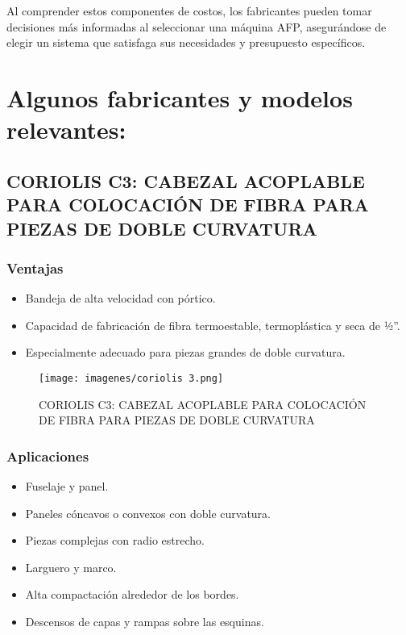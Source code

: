 \begin{enumerate}[label=\arabic*.]
Al comprender estos componentes de costos, los fabricantes pueden tomar decisiones más informadas al seleccionar una máquina AFP, asegurándose de elegir un sistema que satisfaga sus necesidades y presupuesto específicos.

\section{Algunos fabricantes y modelos relevantes:}

\subsection{CORIOLIS C3: CABEZAL ACOPLABLE PARA
COLOCACIÓN DE FIBRA PARA PIEZAS DE DOBLE CURVATURA}

\subsubsection{Ventajas}

\begin{itemize}
    \item Bandeja de alta velocidad con pórtico.
    \item Capacidad de fabricación de fibra termoestable, termoplástica y seca de 1⁄2”.
    \item Especialmente adecuado para piezas grandes de doble curvatura.
\end{itemize}

\begin{figure}[h]
    \centering
    \texttt{[image: imagenes/coriolis 3.png]}
    \caption{CORIOLIS C3: CABEZAL ACOPLABLE PARA
COLOCACIÓN DE FIBRA PARA PIEZAS DE DOBLE CURVATURA}
    \label{fig:enter-label}
\end{figure}


\subsubsection{Aplicaciones}
\begin{itemize}
    \item Fuselaje y panel.
    \item Paneles cóncavos o convexos con doble curvatura.
    \item Piezas complejas con radio estrecho.
    \item Larguero y marco.
    \item Alta compactación alrededor de los bordes.
    \item Descensos de capas y rampas sobre las esquinas.
\end{itemize}


\end{enumerate}
